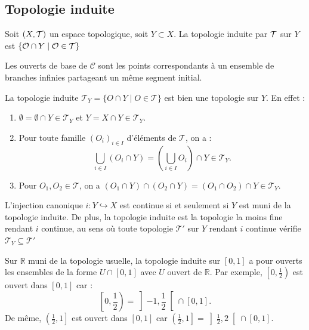 \subsection{Topologie induite}

\begin{definition}
    Soit $(X,\mathcal{T})$ un espace topologique, soit $Y\subset X$. La topologie induite par $\mathcal{T}$ sur $Y$ est $\{\mathcal{O}\cap Y\mid \mathcal{O}\in\mathcal{T}\}$
\end{definition}
Les ouverts de base de $\mathscr C$ sont les points correspondants à un ensemble de branches infinies partageant un même segment initial.

\begin{remarque}
    La topologie induite $\mathcal{T}_Y = \{O \cap Y \mid O \in \mathcal{T}\}$ est bien une topologie sur $Y$. En effet :
\begin{enumerate}
    \item $\emptyset = \emptyset \cap Y \in \mathcal{T}_Y$ et $Y = X \cap Y \in \mathcal{T}_Y$.
    \item Pour toute famille $(O_i)_{i \in I}$ d'éléments de $\mathcal{T}$, on a :
    $$\bigcup_{i \in I} (O_i \cap Y) = \left(\bigcup_{i \in I} O_i\right) \cap Y \in \mathcal{T}_Y.$$
    \item Pour $O_1, O_2 \in \mathcal{T}$, on a $(O_1 \cap Y) \cap (O_2 \cap Y) = (O_1 \cap O_2) \cap Y \in \mathcal{T}_Y$.
\end{enumerate}
\end{remarque}

\begin{remarque}
    L'injection canonique $i : Y \hookrightarrow X$ est continue si et seulement si $Y$ est muni de la topologie induite. De plus, la topologie induite est la topologie la moins fine rendant $i$ continue, au sens où toute topologie $\mathcal{T}'$ sur $Y$ rendant $i$ continue vérifie $\mathcal{T}_Y \subseteq \mathcal{T}'$
\end{remarque}

\begin{exemple}
Sur $\mathbb{R}$ muni de la topologie usuelle, la topologie induite sur $[0,1]$ a pour ouverts les ensembles de la forme $U \cap [0,1]$ avec $U$ ouvert de $\mathbb{R}$. Par exemple, $\left[0, \frac{1}{2}\right)$ est ouvert dans $[0,1]$ car :
$$\left[0, \frac{1}{2}\right) = \left]-1, \frac{1}{2}\right[ \cap [0,1].$$
De même, $\left(\frac{1}{2}, 1\right]$ est ouvert dans $[0,1]$ car $\left(\frac{1}{2}, 1\right] = \left]\frac{1}{2}, 2\right[ \cap [0,1]$.
\end{exemple}

